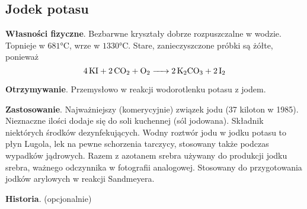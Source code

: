 \subsection{Jodek potasu }
\textbf{Własności fizyczne}.
Bezbarwne kryształy dobrze rozpuszczalne w wodzie.
Topnieje w $681 \si{\celsius}$, wrze w $1330 \si{\celsius}$.
Stare, zanieczyszczone próbki są żółte, ponieważ
$$\ce{4 KI + 2 CO2 + O2 -> 2 K2CO3 + 2 I2}$$

\textbf{Otrzymywanie}.
Przemysłowo w reakcji wodorotlenku potasu z jodem.

\textbf{Zastosowanie}.
Najważniejszy (komerycyjnie) związek jodu (37 kiloton w 1985).
Nieznaczne ilości dodaje się do soli kuchennej (sól jodowana).
Składnik niektórych środków dezynfekujących.
Wodny roztwór jodu w jodku potasu to płyn Lugola, lek na pewne schorzenia tarczycy, stosowany także podczas wypadków jądrowych.
Razem z azotanem srebra używany do produkcji jodku srebra, ważnego odczynnika w fotografii analogowej. 
Stosowany do przygotowania jodków arylowych w reakcji Sandmeyera.

\textbf{Historia}.
(opcjonalnie)



